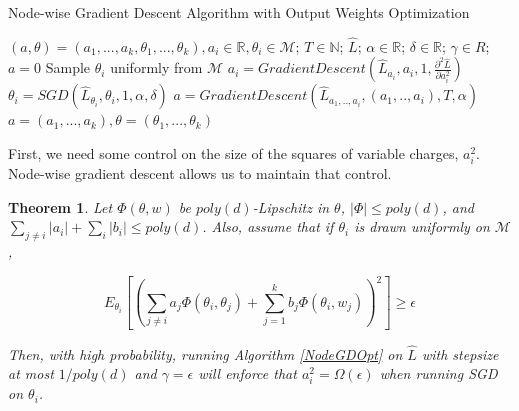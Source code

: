 \documentclass{article}
\newtheorem{theorem}{Theorem}[section]
\newcommand{\N}{{\mathbb{N}}}
\newcommand{\R}{{\mathbb{R}}}
\begin{document}
\begin{algorithm}[hb]
 \caption{Node-wise Gradient Descent Algorithm with Output Weights Optimization}
   \label{NodeGDOpt}
\begin{algorithmic}
    $(a,\theta) = (a_1,...,a_k,\theta_1,...,\theta_k), a_i \in\R, \theta_i\in\mathcal{M}$; $T\in \N$; $\widehat{L}$; $\alpha\in \R$; $\delta \in \R$; $\gamma \in R$; 
   \vspace{0.1in}
    $a = 0$
    \REPEAT \STATE Sample $\theta_i$ uniformly from $\mathcal{M}$ 
    \STATE  $a_i =  GradientDescent(\widehat{L}_{a_i}, a_i, 1, \frac{\partial^2 \hat{L}}{\partial a_i^2})$
    \STATE $\theta_i =  SGD(\widehat{L}_{\theta_i}, \theta_i,1, \alpha,\delta)$
   \ENDFOR
   \STATE    $a =  GradientDescent(\widehat{L}_{a_1,..,a_i}, (a_1,..,a_i), T , \alpha)$\;
   \ENDFOR
    $a = (a_1,...,a_k), \theta = (\theta_1,..., \theta_k)$
   \end{algorithmic}
\end{algorithm}

First, we need some control on the size of the squares of variable charges, $a_i^2$. Node-wise gradient descent allows us to maintain that control.

\begin{theorem}\label{nonDecrease}
Let $\Phi(\theta, w)$ be $poly(d)$-Lipschitz in $\theta$, $|\Phi| \leq poly(d)$, and $\sum_{j \neq i} |a_i| + \sum_i |b_i| \leq poly(d)$. Also, assume that if $\theta_i$ is drawn uniformly on $\mathcal{M}$, 

\[E_{\theta_i}\left[\left(  \sum_{j\neq i} a_j \Phi(\theta_i,\theta_j) + \sum_{j=1}^k b_j \Phi(\theta_i,w_j)\right)^2\right] \geq \epsilon \]

Then, with high probability, running Algorithm \ref{NodeGDOpt} on $\widehat{L}$ with stepsize at most $1/poly(d)$ and $\gamma = \epsilon$ will enforce that $a_i^2 = \Omega(\epsilon)$ when running SGD on $\theta_i$.
\end{theorem}
\end{document}
